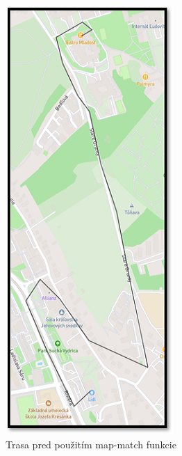 \begin{figure}[H]
    \centering
    \begin{subfigure}{0.45\textwidth}
        \centering
        \includegraphics[width=.5\textwidth]{img/map-match rozdiel/malo bodov pred.png}
        \caption{Trasa pred použitím map-match funkcie}
        \label{fig:map-match-low-points-before}
    \end{subfigure}
    \begin{subfigure}{0.45\textwidth}
        \centering

\end{subfigure}
\end{figure}
